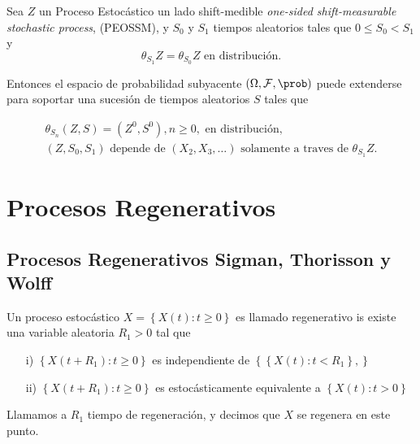 \begin{Teo}
Sea $Z$ un Proceso Estoc\'astico un lado shift-medible \textit{one-sided shift-measurable stochastic process}, (PEOSSM),
y $S_{0}$ y $S_{1}$ tiempos aleatorios tales que $0\leq S_{0}<S_{1}$ y
\begin{equation}
\theta_{S_{1}}Z=\theta_{S_{0}}Z\textrm{ en distribuci\'on}.
\end{equation}

Entonces el espacio de probabilidad subyacente $\left(\Omega,\mathcal{F},\prob\right)$ puede extenderse para soportar una sucesi\'on de tiempos aleatorios $S$ tales que

\begin{eqnarray}
\theta_{S_{n}}\left(Z,S\right)=\left(Z^{0},S^{0}\right),n\geq0,\textrm{ en distribuci\'on},\\
\left(Z,S_{0},S_{1}\right)\textrm{ depende de }\left(X_{2},X_{3},\ldots\right)\textrm{ solamente a traves de }\theta_{S_{1}}Z.
\end{eqnarray}
\end{Teo}


\section{Procesos Regenerativos}

\subsection{Procesos Regenerativos Sigman, Thorisson y Wolff \cite{Sigman2}}


\begin{Def}
Un proceso estoc\'astico $X=\left\{X\left(t\right):t\geq0\right\}$ es llamado regenerativo is existe una variable aleatoria $R_{1}>0$ tal que
\begin{itemize}
\item[i)] $\left\{X\left(t+R_{1}\right):t\geq0\right\}$ es independiente de $\left\{\left\{X\left(t\right):t<R_{1}\right\},\right\}$
\item[ii)] $\left\{X\left(t+R_{1}\right):t\geq0\right\}$ es estoc\'asticamente equivalente a $\left\{X\left(t\right):t>0\right\}$
\end{itemize}

Llamamos a $R_{1}$ tiempo de regeneraci\'on, y decimos que $X$ se regenera en este punto.
\end{Def}

